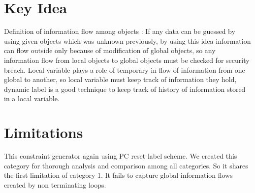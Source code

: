 \section{Key Idea}
Definition of information flow among objects : If any data can be
guessed by using given objects which was unknown previously, by using this
idea information can flow outside only because of modification of global objects,
so any information flow from local objects to global objects must be
checked for security breach. Local variable plays a role of temporary in flow
of information from one global to another, so local variable must keep track
of information they hold, dynamic label is a good technique to keep track of
history of information stored in a local variable.
\section{Limitations}
This constraint generator again using PC reset label scheme. We created this category for thorough analysis and comparison among all categories. So it shares the first limitation of category 1. It fails to capture global information flows created by non terminating loops.   
